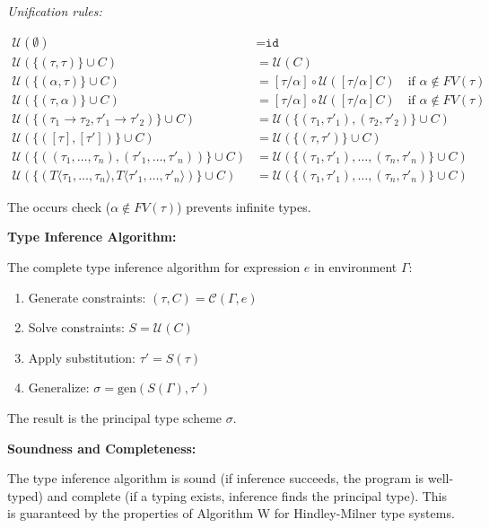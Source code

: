 \documentclass[conference,onecolumn]{IEEEtran}
\begin{document}
\textit{Unification rules:}

\begin{align*}
\mathcal{U}(\emptyset) &= \texttt{id} \\
\mathcal{U}(\{(\tau, \tau)\} \cup C) &= \mathcal{U}(C) \\
\mathcal{U}(\{(\alpha, \tau)\} \cup C) &= [\tau/\alpha] \circ \mathcal{U}([\tau/\alpha]C) \quad \text{if } \alpha \notin FV(\tau) \\
\mathcal{U}(\{(\tau, \alpha)\} \cup C) &= [\tau/\alpha] \circ \mathcal{U}([\tau/\alpha]C) \quad \text{if } \alpha \notin FV(\tau) \\
\mathcal{U}(\{(\tau_1 \to \tau_2, \tau'_1 \to \tau'_2)\} \cup C) &= \mathcal{U}(\{(\tau_1, \tau'_1), (\tau_2, \tau'_2)\} \cup C) \\
\mathcal{U}(\{([\tau], [\tau'])\} \cup C) &= \mathcal{U}(\{(\tau, \tau')\} \cup C) \\
\mathcal{U}(\{((\tau_1, \ldots, \tau_n), (\tau'_1, \ldots, \tau'_n))\} \cup C) &= \mathcal{U}(\{(\tau_1, \tau'_1), \ldots, (\tau_n, \tau'_n)\} \cup C) \\
\mathcal{U}(\{(T\langle\tau_1, \ldots, \tau_n\rangle, T\langle\tau'_1, \ldots, \tau'_n\rangle)\} \cup C) &= \mathcal{U}(\{(\tau_1, \tau'_1), \ldots, (\tau_n, \tau'_n)\} \cup C)
\end{align*}

The occurs check ($\alpha \notin FV(\tau)$) prevents infinite types.

\textbf{Type Inference Algorithm:}

The complete type inference algorithm for expression $e$ in environment $\Gamma$:

\begin{enumerate}
\item Generate constraints: $(\tau, C) = \mathcal{C}(\Gamma, e)$
\item Solve constraints: $S = \mathcal{U}(C)$
\item Apply substitution: $\tau' = S(\tau)$
\item Generalize: $\sigma = \text{gen}(S(\Gamma), \tau')$
\end{enumerate}

The result is the principal type scheme $\sigma$.

\textbf{Soundness and Completeness:}

The type inference algorithm is sound (if inference succeeds, the program is well-typed) and complete (if a typing exists, inference finds the principal type). This is guaranteed by the properties of Algorithm W for Hindley-Milner type systems.
\end{document}
